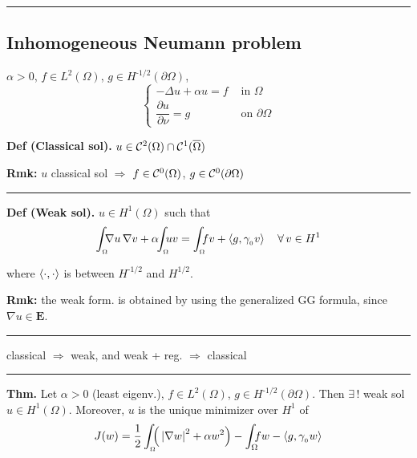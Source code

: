 \rule{0.31\textwidth}{0.2pt}


\subsection{\texorpdfstring{\color{red}Inhomogeneous Neumann problem}{}}


$\alpha>0$, $f\in L^2(\Omega)$, $g\in H^{\text{-}1/2}(\partial\Omega)$,
\begin{equation*}
\begin{cases}
    -\Delta u +\alpha u = f &\text{ in }\Omega\\
    \dfrac{\partial u}{\partial\nu}=g &\text{ on }\partial\Omega    
\end{cases}
\end{equation*}

\textbf{Def (Classical sol).} $u\in\mathcal{C}^2(\Omega)\cap\mathcal{C}^1(\overline{\Omega})$

\smallskip

\textbf{Rmk:} $u$ classical sol $\Rightarrow$ $f\in\mathcal{C}^0(\Omega)$, $g\in\mathcal{C}^0(\partial\Omega)$

\rule{0.31\textwidth}{0.2pt}
\smallskip

\textbf{Def (Weak sol).} $u\in H^1(\Omega)$ such that
\begin{equation*}
\int_{_\Omega}\!\!\! \nabla u\,\nabla v +\alpha\!\!\int_{_\Omega}\!\!\! uv =\int_{_\Omega}\!\!\!fv+\sca{g,\gamma_{_0}v}\quad\forall\, v\in H^1
\end{equation*}

where $\left\langle \cdot,\cdot \right\rangle$ is between $H^{\text{-}1/2}$ and $H^{1/2}$.

\smallskip

\textbf{Rmk:} the weak form. is obtained by using the generalized GG formula, since $\nabla u \in \mathbf{E}$.

\rule{0.31\textwidth}{0.2pt}
\smallskip

classical $\Rightarrow$ weak, and weak + reg. $\Rightarrow$ classical

\rule{0.31\textwidth}{0.2pt}
\smallskip

\textbf{Thm.} Let $\alpha>0$ (least eigenv.), $f\in L^2(\Omega)$, $g\in H^{\text{-}1/2}(\partial\Omega)$. Then $\exists\,!$ weak sol $u\in H^1(\Omega)$. Moreover, $u$ is the unique minimizer over $H^1$ of 
\begin{equation*}
J(w)=\frac{1}{2}\int_{_\Omega}\!\!\!  \Big( \left| \nabla w \right|^2+\alpha w^2 \Big)-\int_\Omega\!\!\!fw-\left\langle g,\gamma_{_0}w \right\rangle
\end{equation*}


